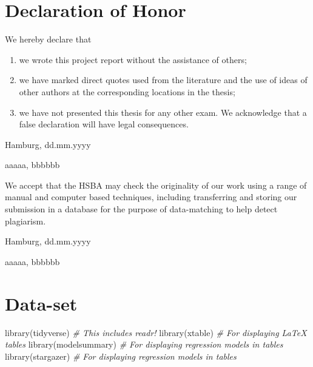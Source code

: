 \documentclass[
  11pt,
  a4paper,
  twoside]{scrbook}
\newenvironment{Shaded}{\begin{snugshade}}{\end{snugshade}}
\newcommand{\CommentTok}[1]{\textcolor[rgb]{0.56,0.35,0.01}{\textit{#1}}}
\newcommand{\FunctionTok}[1]{\textcolor[rgb]{0.00,0.00,0.00}{#1}}
\newcommand{\NormalTok}[1]{#1}
\providecommand{\tightlist}{%
  \setlength{\itemsep}{0pt}\setlength{\parskip}{0pt}}
\begin{document}
\newpage

\hypertarget{declaration-of-honor}{%
\chapter*{Declaration of Honor}\label{declaration-of-honor}}

We hereby declare that

\begin{enumerate}
\def\labelenumi{\arabic{enumi}.}
\tightlist
\item
  we wrote this project report without the assistance of others;
\item
  we have marked direct quotes used from the literature and the use of ideas of other authors at the corresponding locations in the thesis;
\item
  we have not presented this thesis for any other exam. We acknowledge that a false declaration will have legal consequences.
\end{enumerate}

Hamburg, dd.mm.yyyy

aaaaa, bbbbbb

\vspace{2.5cm}

We accept that the HSBA may check the originality of our work using a range of manual and computer based techniques, including transferring and storing our submission in a database for the purpose of data-matching to help detect plagiarism.

Hamburg, dd.mm.yyyy

aaaaa, bbbbbb

\hypertarget{data-set}{%
\chapter{Data-set}\label{data-set}}

\linespread{1}

\begin{Shaded}
\begin{Highlighting}[]
\FunctionTok{library}\NormalTok{(tidyverse) }\CommentTok{\# This includes readr!}
\FunctionTok{library}\NormalTok{(xtable) }\CommentTok{\# For displaying LaTeX tables}
\FunctionTok{library}\NormalTok{(modelsummary) }\CommentTok{\# For displaying regression models in tables}
\FunctionTok{library}\NormalTok{(stargazer) }\CommentTok{\# For displaying regression models in tables}
\end{Highlighting}
\end{Shaded}
\end{document}
